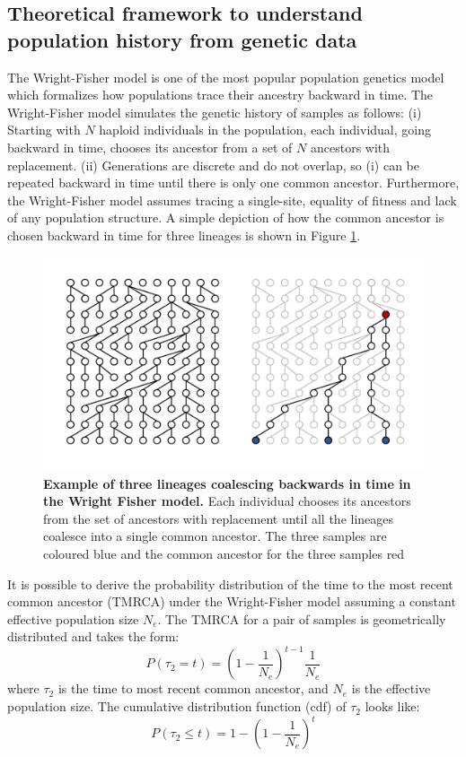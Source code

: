 \subsection{Theoretical framework to understand population history from genetic data}
\label{sec:ch1-gb-theory}

The Wright-Fisher model \cite{Wright1931, Fisher1930} is one of the most popular population genetics model which formalizes how populations trace their ancestry backward in time.  The Wright-Fisher model simulates the genetic history of samples as follows: (i) Starting with $N$ haploid individuals in the population, each individual, going backward in time, chooses its ancestor from a set of $N$ ancestors with replacement. (ii) Generations are discrete and do not overlap, so (i) can be repeated backward in time until there is only one common ancestor. Furthermore, the Wright-Fisher model assumes tracing a single-site, equality of fitness and lack of any population structure. A simple depiction of how the common ancestor is chosen backward in time for three lineages is shown in Figure \ref{fig:coalescent}.

\begin{figure}[h!]
    \centering
    \includegraphics[width=\linewidth]{figures/wright_fisher.pdf}
    \caption{\textbf{Example of three lineages coalescing backwards in time in the Wright Fisher model.} Each individual chooses its ancestors from the set of ancestors with replacement until all the lineages coalesce into a single common ancestor. The three samples are coloured blue and the common ancestor for the three samples red }
    \label{fig:coalescent}
\end{figure}

It is possible to derive the probability distribution of the time to the most recent common ancestor (TMRCA) under the Wright-Fisher model assuming a constant effective population size $N_e$. The TMRCA for a pair of samples is geometrically distributed and takes the form:
\begin{equation}
P(\tau_2 = t) = \left(1 - \frac{1}{N_e}\right)^{t-1} \frac{1}{N_e}
\end{equation}
where $\tau_2$ is the time to most recent common ancestor, and $N_e$ is the effective population size. The cumulative distribution function (cdf) of $\tau_2$ looks like:
\begin{equation}
P(\tau_2 \leq t) = 1 - \left(1 - \frac{1}{N_e}\right)^{t}
\end{equation}

